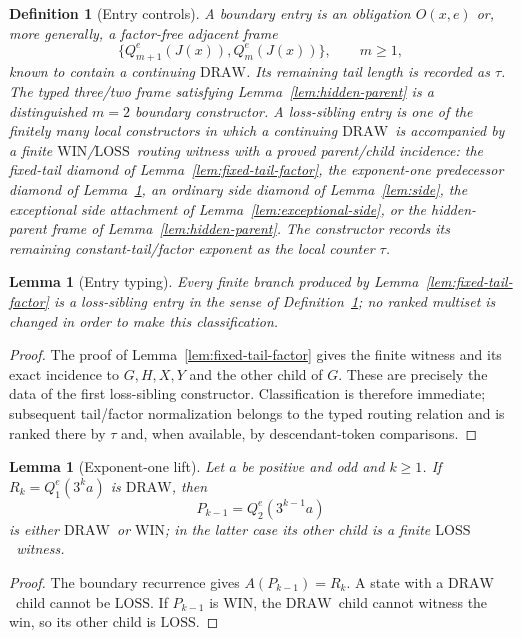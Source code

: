 \documentclass[11pt]{article}
\newtheorem{lemma}[theorem]{Lemma}
\newtheorem{definition}[theorem]{Definition}
\newcommand{\WIN}{\ensuremath{\mathrm{WIN}}}
\newcommand{\LOSS}{\ensuremath{\mathrm{LOSS}}}
\newcommand{\DRAW}{\ensuremath{\mathrm{DRAW}}}
\begin{document}
\begin{definition}[Entry controls]\label{def:entry-controls}
A \emph{boundary entry} is an obligation $O(x,e)$ or, more generally, a
factor-free adjacent frame
\[
 \{Q_{m+1}^e(J(x)),Q_m^e(J(x))\},\qquad m\ge1,
\]
known to contain a continuing \DRAW. Its remaining tail length is recorded as
$\tau$. The typed three/two frame satisfying Lemma~\ref{lem:hidden-parent} is
a distinguished $m=2$ boundary constructor.
A \emph{loss-sibling entry} is one of the finitely many local constructors
in which a continuing \DRAW\ is accompanied by a finite \WIN/\LOSS\ routing
witness with a proved parent/child incidence: the fixed-tail diamond of Lemma~\ref{lem:fixed-tail-factor}, the exponent-one predecessor diamond of Lemma~\ref{lem:exp-one-lift}, an ordinary side diamond of Lemma~\ref{lem:side}, the exceptional side attachment of Lemma~\ref{lem:exceptional-side}, or the hidden-parent frame of Lemma~\ref{lem:hidden-parent}. The constructor records its remaining
constant-tail/factor exponent as the local counter $\tau$.
\end{definition}

\begin{lemma}[Entry typing]\label{lem:entry-typing}
Every finite branch produced by Lemma~\ref{lem:fixed-tail-factor} is a
loss-sibling entry in the sense of Definition~\ref{def:entry-controls}; no
ranked multiset is changed in order to make this classification.
\end{lemma}

\begin{proof}
The proof of Lemma~\ref{lem:fixed-tail-factor} gives the finite witness and
its exact incidence to $G,H,X,Y$ and the other child of $G$. These are
precisely the data of the first loss-sibling constructor. Classification is
therefore immediate; subsequent tail/factor normalization belongs to the
typed routing relation and is ranked there by $\tau$ and, when available,
by descendant-token comparisons.
\end{proof}

\begin{lemma}[Exponent-one lift]\label{lem:exp-one-lift}
Let $a$ be positive and odd and $k\ge1$. If
$R_k=Q_1^e(3^ka)$ is \DRAW, then
\[
  P_{k-1}=Q_2^e(3^{k-1}a)
\]
is either \DRAW\ or \WIN; in the latter case its other child is a finite
\LOSS\ witness.
\end{lemma}

\begin{proof}
The boundary recurrence gives $A(P_{k-1})=R_k$. A state with a \DRAW\ child
cannot be \LOSS. If $P_{k-1}$ is \WIN, the \DRAW\ child cannot witness the
win, so its other child is \LOSS.
\end{proof}
\end{document}
